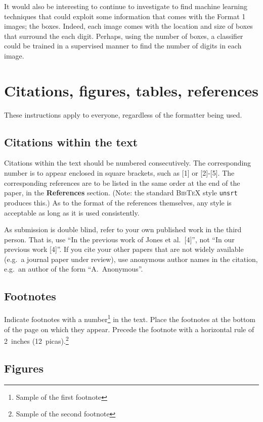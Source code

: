 \documentclass{article} %
\begin{document}
It would also be interesting to continue to investigate to find machine learning techniques that could exploit some information that comes with the Format 1 images; the boxes. Indeed, each image comes with the location and size of boxes that surround the each digit. Perhaps, using the number of boxes, a classifier could be trained in a supervised manner to find the number of digits in each image. 



\section{Citations, figures, tables, references}
\label{others}

These instructions apply to everyone, regardless of the formatter being used.

\subsection{Citations within the text}

Citations within the text should be numbered consecutively. The corresponding
number is to appear enclosed in square brackets, such as [1] or [2]-[5]. The
corresponding references are to be listed in the same order at the end of the
paper, in the \textbf{References} section. (Note: the standard
\textsc{Bib\TeX} style \texttt{unsrt} produces this.) As to the format of the
references themselves, any style is acceptable as long as it is used
consistently.

As submission is double blind, refer to your own published work in the 
third person. That is, use ``In the previous work of Jones et al.\ [4]'',
not ``In our previous work [4]''. If you cite your other papers that
are not widely available (e.g.\ a journal paper under review), use
anonymous author names in the citation, e.g.\ an author of the
form ``A.\ Anonymous''. 


\subsection{Footnotes}

Indicate footnotes with a number\footnote{Sample of the first footnote} in the
text. Place the footnotes at the bottom of the page on which they appear.
Precede the footnote with a horizontal rule of 2~inches
(12~picas).\footnote{Sample of the second footnote}

\subsection{Figures}
\end{document}
